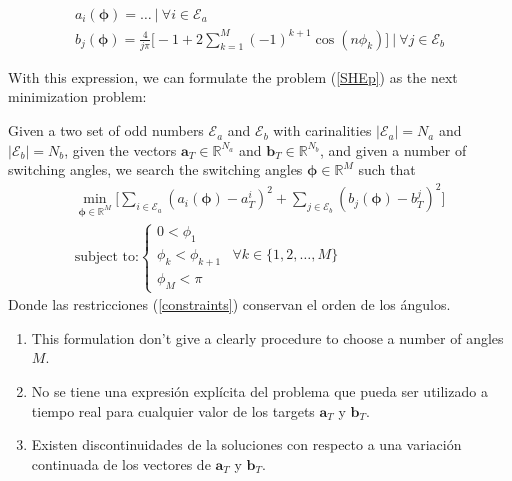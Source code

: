 \begin{gather}
    a_i(\bm{\phi})  = \dots  \ | \ \forall i \in \mathcal{E}_a \\
    b_j(\bm{\phi})  =  \frac{4}{j\pi  } \bigg[ -1 + 2\sum_{k=1}^M  (-1)^{k+1}\cos(n\phi_k) \bigg] \ | \ \forall j \in \mathcal{E}_b
\end{gather}

With this expression, we can formulate the problem (\ref{SHEp}) as the next minimization problem:

\begin{problem}\label{SHEp_clas}
    Given  a two set of odd numbers $\mathcal{E}_a$ and $\mathcal{E}_b$ with carinalities $|\mathcal{E}_a| = N_a$ and  $|\mathcal{E}_b| = N_b$, given the vectors $\bm{a}_T  \in \mathbb{R}^{N_a}$ and $\bm{b}_T  \in \mathbb{R}^{N_b}$, and given a number of switching angles, we search the switching angles $\bm{\phi} \in \mathbb{R}^M$ such that
    \begin{gather}
        \min_{\bm{\phi} \in \mathbb{R}^M} \Big[
        \sum_{i \in \mathcal{E}_a} (a_i(\bm{\phi}) - a^i_T)^2 + 
        \sum_{j \in \mathcal{E}_b} (b_j(\bm{\phi}) - b^j_T)^2  
        \Big] \\
        \text{subject to:} \begin{cases}
            0 < \phi_1  \\
            \phi_k < \phi_{k+1} &  \forall k \in \{1,2,\dots,M \}\\
            \phi_{M} < \pi
        \end{cases} \label{constraints}
    \end{gather} 
    Donde las restricciones (\ref{constraints})  conservan el orden de los ángulos. 
    
\end{problem}


\begin{enumerate}
    \item This formulation don't give a clearly procedure to choose a number of angles $M$.
    \item No se tiene una expresión explícita del problema que pueda ser utilizado a tiempo real para cualquier valor de los targets $\bm{a}_T$ y $\bm{b}_T$.
    \item Existen discontinuidades de la soluciones con respecto a una variación continuada de los vectores de $\bm{a}_T$ y $\bm{b}_T$.
\end{enumerate}



